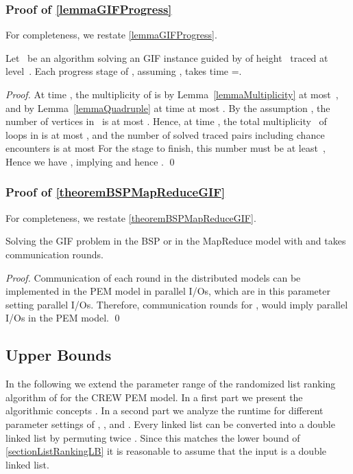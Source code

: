 \documentclass[envcountsame]{llncs}
\def\bO#1{\printmath{\mathcal{O}\left(#1\right)}}
\def\bOm#1{\printmath{\Omega \left(#1\right)}}
\begin{document}
\subsubsection{Proof of \autoref{lemmaGIFProgress}}
For completeness, we restate \autoref{lemmaGIFProgress}.

\begin{lemma}
  Let~ be an algorithm solving an GIF instance \gifInstance guided by \binaryTreeOf{\gifInstance} of height~ traced at level~.
  Each progress stage  of , assuming , takes time =\bOm{\log M}.
\end{lemma}
\begin{proof}
  At time , the multiplicity of  is by Lemma~\ref{lemmaMultiplicity} at most~, and by Lemma~\ref{lemmaQuadruple} at time  at most .
  By the assumption ,  the number of vertices in~ is at most  .
  Hence, at time , the total multiplicity~ of loops in  is at most , and the number of solved traced pairs including chance encounters is at most 
  For the stage to finish, this number must be at least~, 
  Hence we have , implying  and hence .
\qed
\end{proof}

\subsubsection{Proof of \autoref{theoremBSPMapReduceGIF}}
For completeness, we restate \autoref{theoremBSPMapReduceGIF}.

\begin{theorem}
\label{theoremBSPMapReduceGIFRestate}
Solving the GIF problem in the BSP or in the MapReduce model with  and  takes \bOm{\log \inputSize} communication rounds.
\end{theorem}
\begin{proof}
Communication of each round in the distributed models can be implemented in the PEM model in  parallel I/Os, which are in this parameter setting \bO{\log P} parallel I/Os. 
Therefore,  communication rounds for , would imply  parallel I/Os in the PEM model.  
\qed
\end{proof}

\subsection{Upper Bounds}
\label{appendixUpperBounds}

In the following we extend the parameter range of the randomized list ranking algorithm of \cite{2010ArgeEtAlGraphAlgoPEM} for the CREW PEM model. 
In a first part we present the algorithmic concepts \cite{2010ArgeEtAlGraphAlgoPEM,2012ThesisGero,1984VishkinRandomizedLR,1991AndersonMillerRanomizedWorkOptLR}.
In a second part we analyze the runtime for different parameter settings of , \memorySize, \blockSize and . Every linked list can be converted into a double linked list by permuting twice \cite{2010ArgeEtAlGraphAlgoPEM}. Since this matches the lower bound of \autoref{sectionListRankingLB} it is reasonable to assume that the input is a double linked list.
\end{document}
